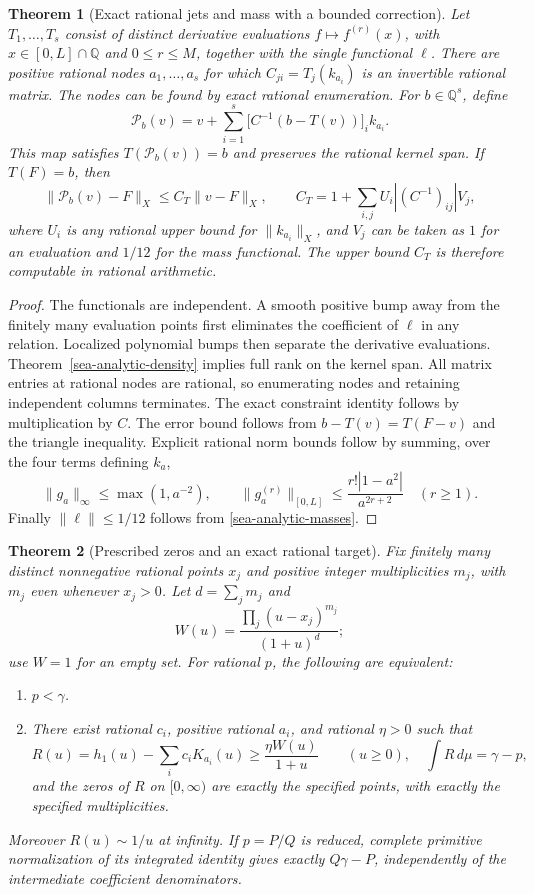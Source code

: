 \documentclass[11pt,a4paper]{article}
\newtheorem{theorem}{Theorem}[section]
\theoremstyle{definition}
\theoremstyle{remark}
\begin{document}
\begin{theorem}[Exact rational jets and mass with a bounded correction]
\label{sea-analytic-projection}
Let $T_1,\ldots,T_s$ consist of distinct derivative evaluations
$f\mapsto f^{(r)}(x)$, with $x\in[0,L]\cap\mathbb Q$ and $0\leq r\leq M$,
together with the single functional $\ell$. There are positive rational
nodes $a_1,\ldots,a_s$ for which $C_{ji}=T_j(k_{a_i})$ is an invertible
rational matrix. The nodes can be found by exact rational enumeration.
For $b\in\mathbb Q^s$, define
\[
\mathcal P_b(v)=v+\sum_{i=1}^s
\bigl[C^{-1}(b-T(v))\bigr]_i k_{a_i}.
\]
This map satisfies $T(\mathcal P_b(v))=b$ and preserves the rational
kernel span. If $T(F)=b$, then
\[
\|\mathcal P_b(v)-F\|_X\leq C_T\|v-F\|_X,
\qquad
C_T=1+\sum_{i,j}U_i|(C^{-1})_{ij}|V_j,
\]
where $U_i$ is any rational upper bound for $\|k_{a_i}\|_X$, and $V_j$
can be taken as $1$ for an evaluation and $1/12$ for the mass functional.
The upper bound $C_T$ is therefore computable in rational arithmetic.
\end{theorem}

\begin{proof}
The functionals are independent. A smooth positive bump away from the
finitely many evaluation points first eliminates the coefficient of $\ell$
in any relation. Localized polynomial bumps then separate the derivative
evaluations. Theorem~\ref{sea-analytic-density} implies full rank on the
kernel span. All matrix entries at rational nodes are rational, so
enumerating nodes and retaining independent columns terminates.
The exact constraint identity follows by multiplication by $C$. The error
bound follows from $b-T(v)=T(F-v)$ and the triangle inequality. Explicit
rational norm bounds follow by summing, over the four terms defining $k_a$,
\[
\|g_a\|_\infty\leq\max(1,a^{-2}),\qquad
\|g_a^{(r)}\|_{[0,L]}\leq
\frac{r!|1-a^2|}{a^{2r+2}}\quad(r\geq1).
\]
Finally $\|\ell\|\leq1/12$ follows from
\eqref{sea-analytic-masses}.
\end{proof}

\begin{theorem}[Prescribed zeros and an exact rational target]
\label{sea-analytic-positive-zeros}
Fix finitely many distinct nonnegative rational points $x_j$ and positive
integer multiplicities $m_j$, with $m_j$ even whenever $x_j>0$.
Let $d=\sum_jm_j$ and
\[
W(u)=\frac{\prod_j(u-x_j)^{m_j}}{(1+u)^d};
\]
use $W=1$ for an empty set. For rational $p$, the following are equivalent:
\begin{enumerate}[label=(\roman*)]
\item $p<\gamma$.
\item There exist rational $c_i$, positive rational $a_i$, and rational
$\eta>0$ such that
\[
R(u)=h_1(u)-\sum_i c_iK_{a_i}(u)
\geq\frac{\eta W(u)}{1+u}\qquad(u\geq0),
\quad
\int R\,d\mu=\gamma-p,
\]
and the zeros of $R$ on $[0,\infty)$ are exactly the specified points,
with exactly the specified multiplicities.
\end{enumerate}
Moreover $R(u)\sim1/u$ at infinity. If $p=P/Q$ is reduced, complete
primitive normalization of its integrated identity gives exactly
$Q\gamma-P$, independently of the intermediate coefficient denominators.
\end{theorem}
\end{document}
